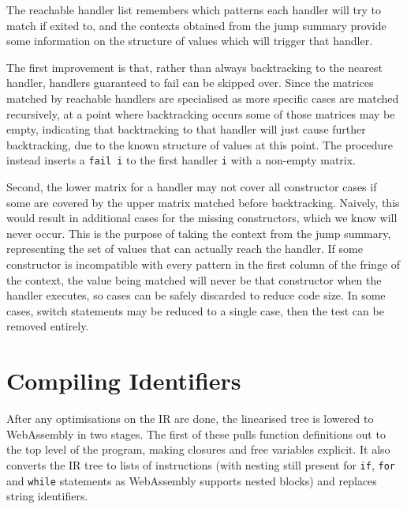 The reachable handler list remembers which patterns each handler will try to match if exited to, and the contexts obtained from the jump summary provide some information on the structure of values which will trigger that handler. 

The first improvement is that, rather than always backtracking to the nearest handler, handlers guaranteed to fail can be skipped over. Since the matrices matched by reachable handlers are specialised as more specific cases are matched recursively, at a point where backtracking occurs some of those matrices may be empty, indicating that backtracking to that handler will just cause further backtracking, due to the known structure of values at this point. The procedure instead inserts a \verb|fail i| to the first handler \verb|i| with a non-empty matrix. %

Second, the lower matrix for a handler may not cover all constructor cases if some are covered by the upper matrix matched before backtracking. Naively, this would result in additional cases for the missing constructors, which we know will never occur. This is the purpose of taking the context from the jump summary, representing the set of values that can actually reach the handler. If some constructor is incompatible with every pattern in the first column of the fringe of the context, the value being matched will never be that constructor when the handler executes, so cases can be safely discarded to reduce code size. In some cases, switch statements may be reduced to a single case, then the test can be removed entirely.



\section{Compiling Identifiers}
After any optimisations on the IR are done, the linearised tree is lowered to WebAssembly in two stages. The first of these pulls function definitions out to the top level of the program, making closures and free variables explicit. It also converts the IR tree to lists of instructions (with nesting still present for \verb|if|, \verb|for| and \verb|while| statements as WebAssembly supports nested blocks) and replaces string identifiers.


